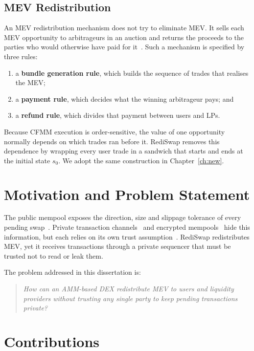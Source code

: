 \subsection{MEV Redistribution}

An MEV redistribution mechanism does not try to eliminate MEV. It sells each MEV opportunity to arbitrageurs in an auction and returns the proceeds to the parties who would otherwise have paid for it~\cite{zhang2024rediswap}. Such a mechanism is specified by three rules:
\begin{enumerate}
    \item a \textbf{bundle generation rule}, which builds the sequence of trades that realises the MEV;
    \item a \textbf{payment rule}, which decides what the winning arbitrageur pays; and
    \item a \textbf{refund rule}, which divides that payment between users and LPs.
\end{enumerate}
Because CFMM execution is order-sensitive, the value of one opportunity normally depends on which trades ran before it. RediSwap removes this dependence by wrapping every user trade in a sandwich that starts and ends at the initial state $s_0$. We adopt the same construction in Chapter~\ref{ch:new}.

\section{Motivation and Problem Statement}

The public mempool exposes the direction, size and slippage tolerance of every pending swap~\cite{lyu2022empirical}. Private transaction channels~\cite{flashbots2022} and encrypted mempools~\cite{blindperm2023} hide this information, but each relies on its own trust assumption~\cite{heimbach2023pbs}. RediSwap redistributes MEV, yet it receives transactions through a private sequencer that must be trusted not to read or leak them.

The problem addressed in this dissertation is:

\begin{quote}
\emph{How can an AMM-based DEX redistribute MEV to users and liquidity providers without trusting any single party to keep pending transactions private?}
\end{quote}

\section{Contributions}

